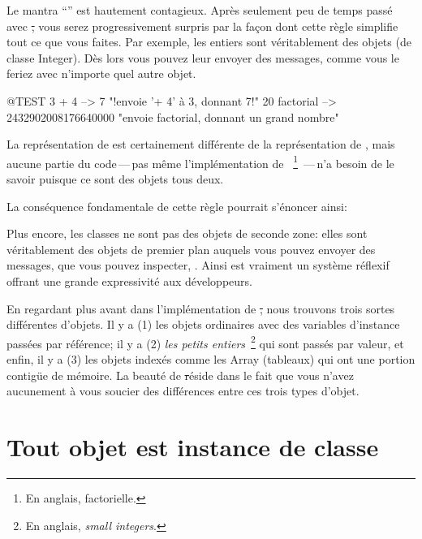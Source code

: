 \documentclass[a4paper,10pt,twoside]{book}
\begin{document}

Le mantra ``\mantra'' est hautement contagieux.
Après seulement peu de temps passé avec \st, vous serez progressivement surpris par la façon dont cette règle simplifie tout ce que vous faites.
Par exemple, les entiers sont véritablement des objets (de classe Integer). Dès lors vous pouvez leur envoyer des messages, comme vous le feriez avec n'importe quel autre objet.

\begin{code}{@TEST}
3 + 4            --> 7    "!envoie '+ 4' à 3, donnant 7!"
20 factorial  --> 2432902008176640000   "envoie factorial, donnant un grand nombre"
\end{code}

La représentation de  est certainement différente de la représentation de , mais aucune partie du code\,---\,pas même l'implémentation de 
~\footnote{En anglais, factorielle.}
\,---\,n'a besoin de le savoir puisque ce sont des objets tous deux.

La conséquence fondamentale de cette règle pourrait s'énoncer ainsi:

Plus encore, les classes ne sont pas des objets de seconde zone: elles sont véritablement des objets de premier plan auquels vous pouvez envoyer des messages, que vous pouvez inspecter, \etc.
Ainsi \pharo est vraiment un système réflexif offrant une grande expressivité
aux développeurs.

En regardant plus avant dans l'implémentation de \st, nous trouvons
trois sortes différentes d'objets. Il y a (1) les objets ordinaires
avec des variables d'instance passées par référence; il y a (2)
\emph{les petits entiers}~\footnote{En anglais, \emph{small
    integers}.} qui sont passés par valeur, et enfin, il y a (3) les
objets 
indexés comme les Array (tableaux) qui ont une portion contig\"ue de mémoire. La beauté de \st réside 
dans le fait que vous n'avez aucunement à vous soucier des différences entre ces trois types
d'objet.


\section{Tout objet est instance de classe}

\end{document}
